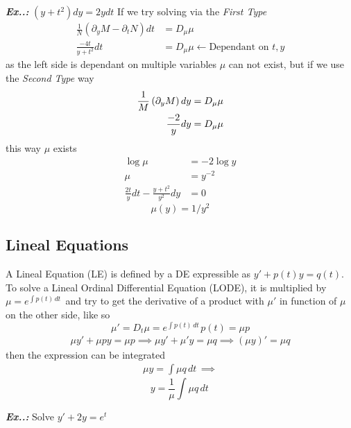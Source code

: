 \documentclass[a4paper]{article}
\begin{document}
\vspace{2ex}\textit{\textbf{Ex.\thesection.\theprob:}} $(y+t^2)dy=2ydt$
If we try solving via the \textit{First Type}
\begin{align}
    \frac{1}{N}\left(\partial_yM-\partial_tN\right)dt&=D_\mu\mu \\
    \frac{-4t}{y+t^2}dt&=D_\mu\mu \leftarrow\text{Dependant on }t,y
\end{align}
as the left side is dependant on multiple variables $\mu$ can not exist, but if we use the \textit{Second Type} way
\begin{align}
    \frac{1}{M}\left(\patchcmd_tN-\partial_yM\right)dy&=D_\mu\mu \\
    \frac{-2}{y}dy&=D_\mu\mu 
\end{align}
this way $\mu$ exists
\begin{align}
    \log\mu &= -2\log y \\
    \mu &=y^{-2} \\
    \frac{2t}{y}dt-\frac{y+t^2}{y^2}dy&=0
\end{align}
$$
\boxed{\mu(y)=1/y^2}
$$

\subsection{Lineal Equations}
\setcounter{equation}{0}

A Lineal Equation (LE) is defined by a DE expressible as $y'+p(t)y=q(t)$. To solve a Lineal Ordinal Differential Equation (LODE), it is multiplied by $\mu=e^{ \int p(t) \, dt\, }$  and try to get the derivative of a product with $\mu'$ in function of $\mu$ on the other side, like so
$$
\mu'=D_{t}\mu=e^{ \int p(t) \, dt\,  }p(t)=\mu p
$$
\begin{align}
\mu y'+\mu py=\mu p\implies \mu y'+\mu'y=\mu q\implies(\mu y)'=\mu q
\end{align}
then the expression can be integrated
\begin{align}
\mu y=\int \mu q \, dt\, \implies
\end{align}
$$
\boxed{y=\frac{1}{\mu}\int \mu q \, dt\, }
$$
\vspace{1ex}\vspace{1ex}

\vspace{2ex}\textbf{\textit{Ex.\thesection.\theex: }}Solve $y'+2y=e^{t}$
\end{document}
